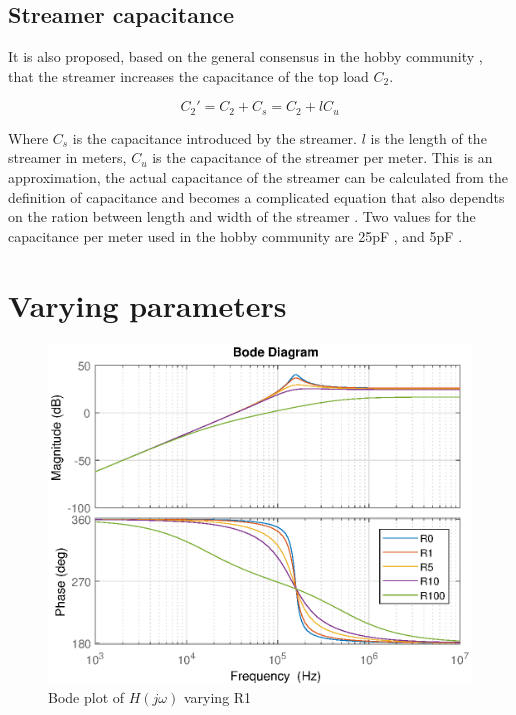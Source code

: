 
\subsection{Streamer capacitance}
It is also proposed, based on the general consensus in the hobby community \citep{streamercapacitance}, that the streamer increases the capacitance of the top load $C_2$.

\begin{equation}
    C_2' = C_2 + C_s = C_2 + l C_u
\end{equation}

Where $C_s$ is the capacitance introduced by the streamer. $l$ is the length of the streamer in meters, $C_u$ is the capacitance of the streamer per meter. This is an approximation, the actual capacitance of the streamer can be calculated from the definition of capacitance and becomes a complicated equation that also dependts on the ration between length and width of the streamer \citep{thinstraight}. Two values for the capacitance per meter used in the hobby community are 25pF \citep{conner}, and 5pF \citep{scantesla}.

\section{Varying parameters}

\begin{figure}[H]
    \centering
    \includegraphics[width=\textwidth]{img/CoilRigBode_R1.eps}
    \caption{Bode plot of $H(j\omega)$ varying R1}
    \label{fig:bode_r1}
\end{figure}

